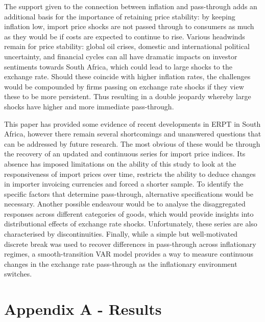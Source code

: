 \documentclass[12pt]{article}
\begin{document}
The support given to the connection between inflation and pass-through adds an additional basis for the importance of retaining price stability: by keeping inflation low, import price shocks are not passed through to consumers as much as they would be if costs are expected to continue to rise. Various headwinds remain for price stability: global oil crises, domestic and international political uncertainty, and financial cycles can all have dramatic impacts on investor sentiments towards South Africa, which could lead to large shocks to the exchange rate. Should these coincide with higher inflation rates, the challenges would be compounded by firms passing on exchange rate shocks if they view these to be more persistent. Thus resulting in a double jeopardy whereby large shocks have higher and more immediate pass-through. 

This paper has provided some evidence of recent developments in ERPT in South Africa, however there remain several shortcomings and unanswered questions that can be addressed by future research. The most obvious of these would be through the recovery of an updated and continuous series for import price indices. Its absence has imposed limitations on the ability of this study to look at the responsiveness of import prices over time, restricts the ability to deduce changes in importer invoicing currencies and forced a shorter sample. To identify the specific factors that determine pass-through, alternative specifications would be necessary. Another possible endeavour would be to analyse the disaggregated responses across different categories of goods, which would provide insights into distributional effects of exchange rate shocks. Unfortunately, these series are also characterised by discontinuities. Finally, while a simple but well-motivated discrete break was used to recover differences in pass-through across inflationary regimes, a smooth-transition VAR model provides a way to measure continuous changes in the exchange rate pass-through as the inflationary environment switches. 

\pagebreak

\printbibliography

\pagebreak

\appendix

\section*{Appendix A - Results}


\end{document}
